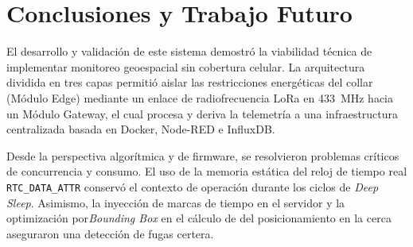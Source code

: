 \section{Conclusiones y Trabajo Futuro}

El desarrollo y validación de este sistema demostró la viabilidad técnica de implementar monitoreo geoespacial sin cobertura celular. La arquitectura dividida en tres capas permitió aislar las restricciones energéticas del collar (Módulo Edge) mediante un enlace de radiofrecuencia LoRa en 433~MHz hacia un Módulo Gateway, el cual procesa y deriva la telemetría a una infraestructura centralizada basada en Docker, Node-RED e InfluxDB.

Desde la perspectiva algorítmica y de firmware, se resolvieron problemas críticos de concurrencia y consumo. El uso de la memoria estática del reloj de tiempo real \texttt{RTC\_DATA\_ATTR} conservó el contexto de operación durante los ciclos de \textit{Deep Sleep}. Asimismo, la inyección de marcas de tiempo en el servidor y la optimización por\textit{Bounding Box} en el cálculo de del posicionamiento en la cerca aseguraron una detección de fugas certera.
